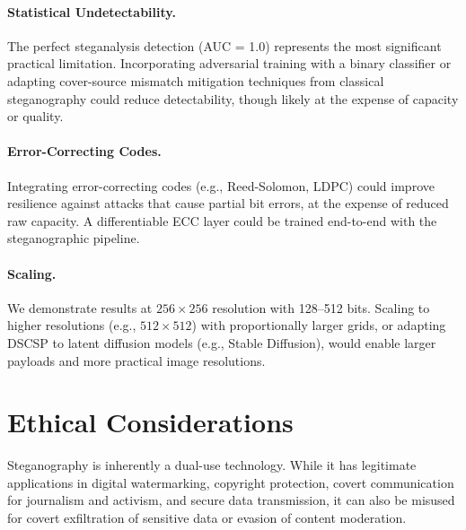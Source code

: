 \documentclass[10pt, twocolumn]{article}
\begin{document}
\paragraph{Statistical Undetectability.}
The perfect steganalysis detection (AUC = 1.0) represents the most significant practical limitation.
Incorporating adversarial training with a binary classifier or adapting cover-source mismatch mitigation techniques from classical steganography could reduce detectability, though likely at the expense of capacity or quality.

\paragraph{Error-Correcting Codes.}
Integrating error-correcting codes (e.g., Reed-Solomon, LDPC) could improve resilience against attacks that cause partial bit errors, at the expense of reduced raw capacity.
A differentiable ECC layer could be trained end-to-end with the steganographic pipeline.

\paragraph{Scaling.}
We demonstrate results at $256 \times 256$ resolution with 128--512 bits.
Scaling to higher resolutions (e.g., $512 \times 512$) with proportionally larger grids, or adapting DSCSP to latent diffusion models (e.g., Stable Diffusion), would enable larger payloads and more practical image resolutions.


\section{Ethical Considerations}
\label{sec:ethics}

Steganography is inherently a dual-use technology.
While it has legitimate applications in digital watermarking, copyright protection, covert communication for journalism and activism, and secure data transmission, it can also be misused for covert exfiltration of sensitive data or evasion of content moderation.
\end{document}

